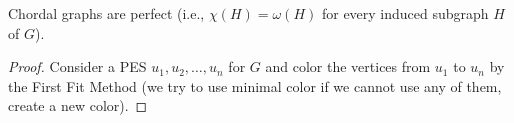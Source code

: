 \begin{cor}
	Chordal graphs are perfect (i.e., $\chi(H) = \omega(H)$ for every induced subgraph $H$ of $G$).
\end{cor}

\begin{proof}
	Consider a PES $u_1, u_2, \dots, u_n$ for $G$ and color the vertices from $u_1$ to $u_n$ by the First Fit Method (we try to use minimal color if we cannot use any of them, create a new color).
\end{proof}